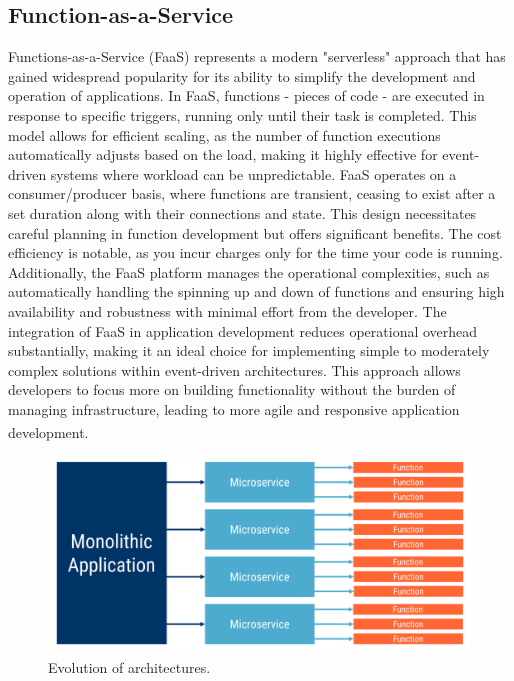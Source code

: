\subsection{Function-as-a-Service}
Functions-as-a-Service (FaaS) represents a modern "serverless" approach that has gained widespread
popularity for its ability to simplify the development and operation of applications. In FaaS,
functions - pieces of code - are executed in response to specific triggers, running only until their
task is completed. This model allows for efficient scaling, as the number of function executions
automatically adjusts based on the load, making it highly effective for event-driven systems where
workload can be unpredictable.\newline\newline
FaaS operates on a consumer/producer basis, where functions are transient, ceasing to exist after a
set duration along with their connections and state. This design necessitates careful planning in
function development but offers significant benefits. The cost efficiency is notable, as you incur
charges only for the time your code is running. Additionally, the FaaS platform manages the
operational complexities, such as automatically handling the spinning up and down of functions and
ensuring high availability and robustness with minimal effort from the developer.\newline\newline
The integration of FaaS in application development reduces operational overhead substantially,
making it an ideal choice for implementing simple to moderately complex solutions within
event-driven architectures. This approach allows developers to focus more on building functionality
without the burden of managing infrastructure, leading to more agile and responsive application
development\textsuperscript{\cite{event_book}}.

\begin{figure}
    \centering
    \includegraphics[scale=0.5]{Pictures/3_faas.png}
    \caption{Evolution of architectures\textsuperscript{\cite{serverless_9}}.}
    \label{fig:3_faas}
\end{figure}

